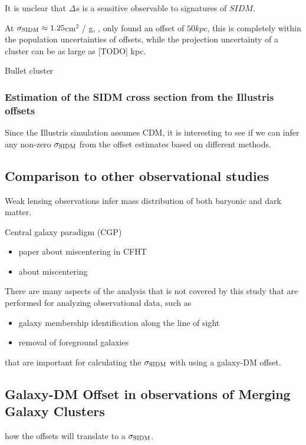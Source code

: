 It is unclear that $\Delta s$ is a sensitive observable to signatures of
$SIDM$.


At $\sigma_{\rm SIDM} \approx 1.25 $cm$^2$ / g, 
\citealt{Randall2008d}, \citealt{Robertson2016} only found an offset of $50
kpc$, this is completely within the population uncertainties of offsets, 
while the projection uncertainty of a cluster can be as large as  
[TODO]$ $ kpc.


Bullet cluster 


\subsubsection{Estimation of the SIDM cross section from the Illustris offsets}
Since the Illustris simulation assumes CDM, it is interesting to see if we can
infer any non-zero $\sigma_{\rm SIDM}$ from the offset estimates based on
different methods.  




\subsection{Comparison to other observational studies}

Weak lensing observations infer mass distribution of both baryonic and dark matter.   

Central galaxy paradigm (CGP)
\begin{itemize}
	\item \cite{Ford2014} paper about miscentering in CFHT 	
	\item \cite{George2012a} about miscentering
\end{itemize}





There are many aspects of the analysis that is not covered by this study that
are performed for analyzing observational data, such as 

\begin{itemize}
		\item galaxy membership identification along the line of sight
		\item removal of foreground galaxies  
	\end{itemize}
	that are important for calculating the $\sigma_{\rm SIDM}$ with using a
	galaxy-DM offset. 


\subsection{Galaxy-DM Offset in observations of Merging Galaxy Clusters}
how the offsets will translate to a $\sigma_{\rm SIDM}$.


